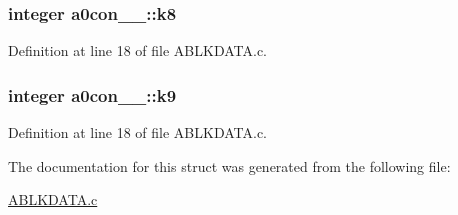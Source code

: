\subsubsection[{\texorpdfstring{k8}{k8}}]{\setlength{\rightskip}{0pt plus 5cm}integer a0con\+\_\+\_\+\+::k8}\hypertarget{structa0con__1___a53571959fe0c5b79655dc30fe8ae66c7}{}\label{structa0con__1___a53571959fe0c5b79655dc30fe8ae66c7}


Definition at line 18 of file A\+B\+L\+K\+D\+A\+T\+A.\+c.

\subsubsection[{\texorpdfstring{k9}{k9}}]{\setlength{\rightskip}{0pt plus 5cm}integer a0con\+\_\+\_\+\+::k9}\hypertarget{structa0con__1___a766bebd932f588262f7daa1833d45062}{}\label{structa0con__1___a766bebd932f588262f7daa1833d45062}


Definition at line 18 of file A\+B\+L\+K\+D\+A\+T\+A.\+c.



The documentation for this struct was generated from the following file\+:\begin{DoxyCompactItemize}
\item 
\hyperlink{ABLKDATA_8c}{A\+B\+L\+K\+D\+A\+T\+A.\+c}\end{DoxyCompactItemize}
